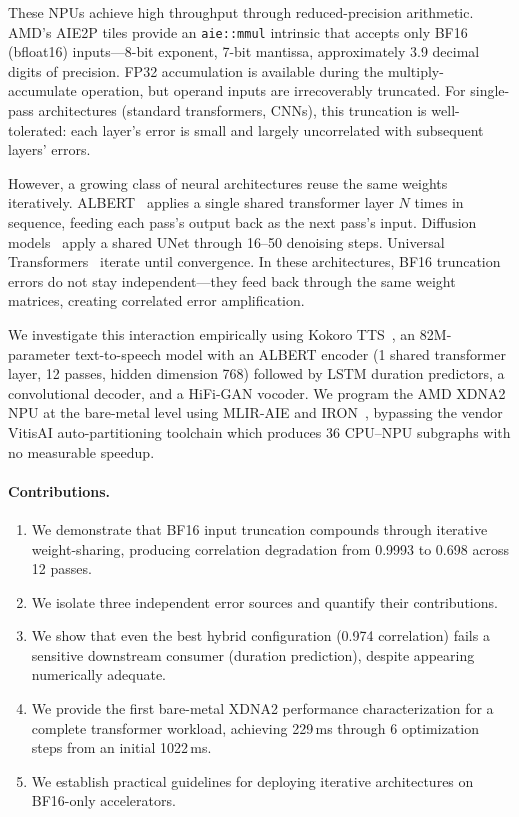 \documentclass[11pt]{article}
\begin{document}
These NPUs achieve high throughput through reduced-precision arithmetic. AMD's AIE2P tiles provide an \texttt{aie::mmul} intrinsic that accepts only BF16 (bfloat16) inputs---8-bit exponent, 7-bit mantissa, approximately 3.9 decimal digits of precision. FP32 accumulation is available during the multiply-accumulate operation, but operand inputs are irrecoverably truncated. For single-pass architectures (standard transformers, CNNs), this truncation is well-tolerated: each layer's error is small and largely uncorrelated with subsequent layers' errors.

However, a growing class of neural architectures reuse the same weights iteratively. ALBERT~\citep{lan2020albert} applies a single shared transformer layer $N$ times in sequence, feeding each pass's output back as the next pass's input. Diffusion models~\citep{ho2020denoising} apply a shared UNet through 16--50 denoising steps. Universal Transformers~\citep{dehghani2019universal} iterate until convergence. In these architectures, BF16 truncation errors do not stay independent---they feed back through the same weight matrices, creating correlated error amplification.

We investigate this interaction empirically using Kokoro TTS~\citep{kokoro2024}, an 82M-parameter text-to-speech model with an ALBERT encoder (1 shared transformer layer, 12 passes, hidden dimension 768) followed by LSTM duration predictors, a convolutional decoder, and a HiFi-GAN vocoder. We program the AMD XDNA2 NPU at the bare-metal level using MLIR-AIE and IRON~\citep{iron2024}, bypassing the vendor VitisAI auto-partitioning toolchain which produces 36 CPU--NPU subgraphs with no measurable speedup.

\paragraph{Contributions.}
\begin{enumerate}[nosep]
    \item We demonstrate that BF16 input truncation compounds through iterative weight-sharing, producing correlation degradation from 0.9993 to 0.698 across 12 passes.
    \item We isolate three independent error sources and quantify their contributions.
    \item We show that even the best hybrid configuration (0.974 correlation) fails a sensitive downstream consumer (duration prediction), despite appearing numerically adequate.
    \item We provide the first bare-metal XDNA2 performance characterization for a complete transformer workload, achieving 229\,ms through 6 optimization steps from an initial 1022\,ms.
    \item We establish practical guidelines for deploying iterative architectures on BF16-only accelerators.
\end{enumerate}
\end{document}
